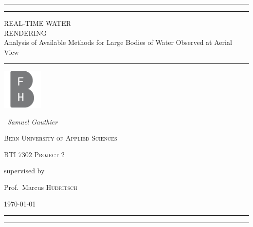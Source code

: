 \begin{titlepage}
	\centering

    \rule{0.9\textwidth}{1pt} 

	\vspace{2pt}\vspace{-\baselineskip}

	\rule{0.9\textwidth}{0.4pt}

	\vspace{0.1\textheight}

    \textcolor[rgb]{0.78,0,0}{
    {\Huge REAL-TIME WATER}\\[0.5\baselineskip]
    {\Huge RENDERING}\\[1.7\baselineskip]
    {\Large Analysis of Available Methods for Large Bodies of Water Observed at
    Aerial View}\\
    }%

    \vspace{0.025\textheight}
    \rule{0.3\textwidth}{0.4pt}

    \vspace{2cm}
    \includegraphics[width=0.15\textwidth]{figures/BFH_Logo_BW.pdf}\par\vspace{1cm}
    \vspace{1cm}
    {\Large{\itshape~Samuel Gauthier\/}\par}{}
    \vspace{0.5cm}
    {\scshape Bern University of Applied Sciences\par}
	{\scshape\Large BTI 7302 Project 2\par}

	\vspace{1cm}
	supervised by\par
	Prof.~Marcus \textsc{Hudritsch}
    \vspace{1cm}
	\vfill

    {\large \today\par}%
    \vfill

    \rule{0.9\textwidth}{0.4pt}

	\vspace{2pt}\vspace{-\baselineskip}

	\rule{0.9\textwidth}{1pt}

\end{titlepage}
\restoregeometry{}

